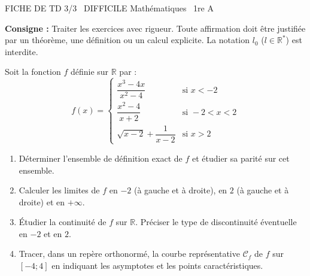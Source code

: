\documentclass[11pt]{article}
\begin{document}
\begin{tcolorbox}[enhanced,colback=popink,colframe=popink,arc=10pt,boxrule=0pt,left=12pt,right=12pt,top=9pt,bottom=9pt]
{\color{white}\popxbold\small FICHE DE TD 3/3 \textbullet\ DIFFICILE \hfill Mathématiques \textbullet\ 1re A\par}
\end{tcolorbox}
\vspace{4pt}
\noindent\textbf{Consigne :} Traiter les exercices avec rigueur. Toute affirmation doit être justifiée par un théorème, une définition ou un calcul explicite. La notation $l_0$ ($l\in\mathbb{R}^*$) est interdite.

\begin{exercice}
Soit la fonction $f$ définie sur $\mathbb{R}$ par :
\[
f(x) = \begin{cases}
\dfrac{x^3 - 4x}{x^2 - 4} & \text{si } x < -2 \\[1em]
\dfrac{x^2 - 4}{x + 2} & \text{si } -2 < x < 2 \\[1em]
\sqrt{x-2} + \dfrac{1}{x-2} & \text{si } x > 2
\end{cases}
\]
\begin{enumerate}
    \item Déterminer l'ensemble de définition exact de $f$ et étudier sa parité sur cet ensemble.
    \item Calculer les limites de $f$ en $-2$ (à gauche et à droite), en $2$ (à gauche et à droite) et en $+\infty$.
    \item Étudier la continuité de $f$ sur $\mathbb{R}$. Préciser le type de discontinuité éventuelle en $-2$ et en $2$.
    \item Tracer, dans un repère orthonormé, la courbe représentative $\mathcal{C}_f$ de $f$ sur $[-4; 4]$ en indiquant les asymptotes et les points caractéristiques.
\end{enumerate}
\end{exercice}
\end{document}
